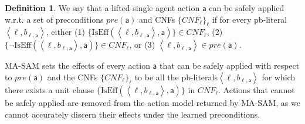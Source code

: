\documentclass[letterpaper]{article} %
\newcommand{\pre}{\textit{pre}}
\newcommand{\eff}{\textit{eff}}
\theoremstyle{definition}
\newtheorem{definition}{Definition}
\theoremstyle{remark}
\newcommand{\tuple}[1]{\ensuremath{\left \langle #1 \right \rangle }}
\newcommand{\lifted}{\textit{lifted}}
\newcommand{\cnf}{\textit{CNF}}
\newcommand{\liftl}{\ensuremath{\ell}}
\newcommand{\lifta}{\mathsf{a}}
\newcommand{\iseff}{\text{IsEff}}
\newcommand{\masam}{\ac{MA-SAM}\xspace}
\newcommand{\pbl}{pb-literal\xspace}
\newcommand{\pbls}{pb-literals\xspace}
\newcommand{\roni}[1]{{\textcolor{red}{[Roni: #1]}}}
\newcommand{\brendan}[1]{{\textcolor{orange}{[Brendan: #1]}}}
\begin{document}
\begin{definition}\label{def:lemma-legal-actions}
We say that a lifted single agent action $\lifta$ can be safely applied
w.r.t. a set of preconditions $\pre(\lifta)$ and CNFs $\{\cnf_\liftl\}_\liftl$
if for every \pbl $\tuple{\liftl,b_{\liftl,\lifta}}$, either
(1) $\{\iseff(\tuple{\liftl,b_{\liftl,\lifta}}, \lifta)\} \in CNF_\liftl$,
(2) $\{\neg\iseff(\tuple{\liftl,b_{\liftl,\lifta}}, \lifta)\} \in CNF_\liftl$, or
(3) $\tuple{\liftl,b_{\liftl,\lifta}}\in\pre(\lifta)$.
\end{definition} %
\masam sets the effects of every action $\lifta$ that can be safely applied with respect to $\pre(\lifta)$ and the CNFs $\{CNF_\liftl\}_\liftl$ to be all the \pbls $\tuple{\liftl,b_{\liftl,\lifta}}$ for which there exists a unit clause $\{\iseff(\tuple{\liftl,b_{\liftl,\lifta}},\lifta)\}$ in $CNF_\liftl$.
Actions that cannot be safely applied are removed from the action model returned by \masam, as we cannot accurately discern their effects under the learned preconditions.
\end{document}
